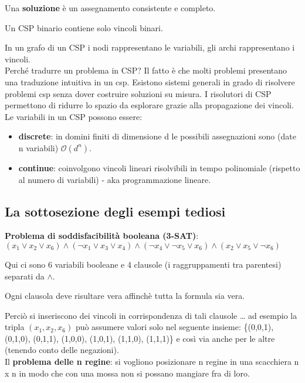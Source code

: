 Una \textbf{soluzione} è un assegnamento consistente e completo.

Un CSP binario contiene solo vincoli binari.

In un grafo di un CSP i nodi rappresentano le variabili, gli archi rappresentano
i vincoli.\\

Perché tradurre un problema in CSP? Il fatto è che molti problemi presentano
una traduzione intuitiva in un csp. Esistono sistemi generali in grado di
risolvere problemi csp senza dover costruire soluzioni su misura.
I risolutori di CSP permettono di ridurre lo spazio da esplorare grazie
alla propagazione dei vincoli.\\

Le variabili in un CSP possono essere:

\begin{itemize}
 \item \textbf{discrete}: in domini finiti di dimensione d le possibili
assegnazioni sono (date n variabili) $\mathcal{O}(d^n)$.
 \item \textbf{continue}: coinvolgono vincoli lineari risolvibili in tempo
polinomiale (rispetto al numero di variabili) - aka programmazione lineare.
\end{itemize}

\subsection{La sottosezione degli esempi tediosi}

\textbf{Problema di soddisfacibilità booleana (3-SAT)}:\\

$(x_1 \lor x_2 \lor x_6) \land (\neg x_1 \lor x_3 \lor x_4) \land
(\neg x_4 \lor \neg x_5 \lor x_6) \land (x_2 \lor x_5 \lor \neg x_6)$

Qui ci sono 6 variabili booleane e 4 clausole (i raggruppamenti tra parentesi)
separati da $\land$.

Ogni clausola deve risultare vera affinchè tutta la formula sia
vera.

Perciò si inseriscono dei vincoli in corrispondenza di tali clausole \dots
ad esempio la tripla $(x_1, x_2, x_6)$ può assumere valori solo nel seguente
insieme: \{(0,0,1), (0,1,0), (0,1,1), (1,0,0), (1,0,1), (1,1,0), (1,1,1)\} e
così via anche per le altre (tenendo conto delle negazioni).\\

Il \textbf{problema delle n regine}: si vogliono posizionare n regine in
una scacchiera n x n in modo che con una mossa non si possano mangiare
fra di loro.\\

